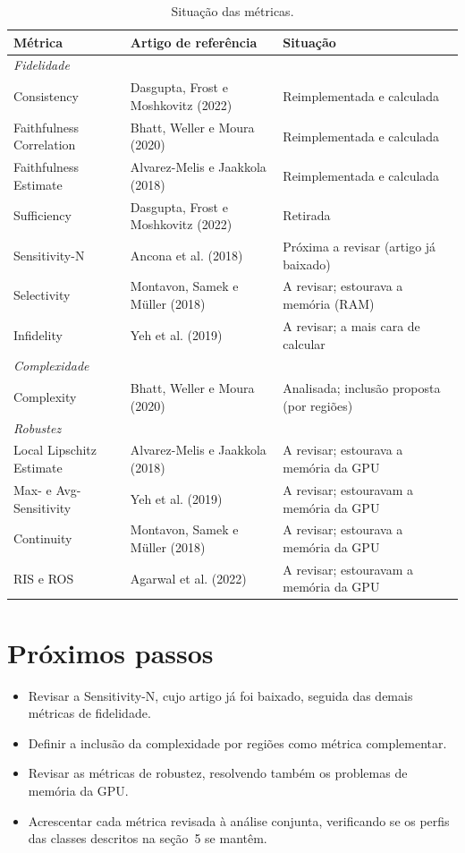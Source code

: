 \documentclass[11pt,a4paper]{article}
\begin{document}
\begin{table}[H]
\centering
\small
\caption{Situação das métricas.}
\begin{tabularx}{\textwidth}{lXl}
\toprule
\textbf{Métrica} & \textbf{Artigo de referência} & \textbf{Situação} \\
\midrule
\multicolumn{3}{l}{\textit{Fidelidade}} \\
Consistency & Dasgupta, Frost e Moshkovitz (2022) & Reimplementada e calculada \\
Faithfulness Correlation & Bhatt, Weller e Moura (2020) & Reimplementada e calculada \\
Faithfulness Estimate & Alvarez-Melis e Jaakkola (2018) & Reimplementada e calculada \\
Sufficiency & Dasgupta, Frost e Moshkovitz (2022) & Retirada \\
Sensitivity-N & Ancona et al. (2018) & Próxima a revisar (artigo já baixado) \\
Selectivity & Montavon, Samek e Müller (2018) & A revisar; estourava a memória (RAM) \\
Infidelity & Yeh et al. (2019) & A revisar; a mais cara de calcular \\
\midrule
\multicolumn{3}{l}{\textit{Complexidade}} \\
Complexity & Bhatt, Weller e Moura (2020) & Analisada; inclusão proposta (por regiões) \\
\midrule
\multicolumn{3}{l}{\textit{Robustez}} \\
Local Lipschitz Estimate & Alvarez-Melis e Jaakkola (2018) & A revisar; estourava a memória da GPU \\
Max- e Avg-Sensitivity & Yeh et al. (2019) & A revisar; estouravam a memória da GPU \\
Continuity & Montavon, Samek e Müller (2018) & A revisar; estourava a memória da GPU \\
RIS e ROS & Agarwal et al. (2022) & A revisar; estouravam a memória da GPU \\
\bottomrule
\end{tabularx}
\end{table}

\section{Próximos passos}
\begin{itemize}
    \item Revisar a Sensitivity-N, cujo artigo já foi baixado, seguida das demais métricas de fidelidade.
    \item Definir a inclusão da complexidade por regiões como métrica complementar.
    \item Revisar as métricas de robustez, resolvendo também os problemas de memória da GPU.
    \item Acrescentar cada métrica revisada à análise conjunta, verificando se os perfis das classes descritos na seção~5 se mantêm.
\end{itemize}
\end{document}
